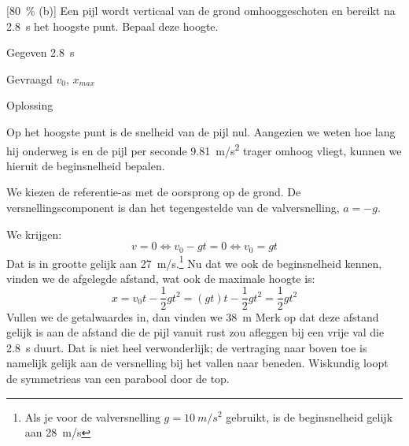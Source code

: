 
[\SI{80}{\percent} (b)] Een pijl wordt verticaal van de grond omhooggeschoten en bereikt na \SI{2,8}{s} het hoogste punt. Bepaal deze hoogte.
\begin{oplossing}
\item[Gegeven]\SI{2,8}{s}
\item[Gevraagd]$v_0$, $x_{max}$

\item[Oplossing]\begin{minipage}[t]{0.6\linewidth}
	Op het hoogste punt is de snelheid van de pijl nul. Aangezien we weten hoe lang hij onderweg is en de pijl per seconde \SI{9,81}{m/s^2} trager omhoog vliegt, kunnen we hieruit de beginsnelheid bepalen. 
	
	We kiezen de referentie-as met de oorsprong op de grond. De versnellingscomponent is dan het tegengestelde van de valversnelling, $a=-g$.
\end{minipage}%
\begin{minipage}[t]{0.37\linewidth}
	\raisebox{1ex-\height}{%
	\texttt{[image: 55p44]}%
	}
\end{minipage}

We krijgen:
\begin{equation*}
v=0\Leftrightarrow v_0-gt=0\Leftrightarrow v_0=gt
\end{equation*}
Dat is in grootte gelijk aan \SI{27}{m/s}.\footnote{Als je voor de valversnelling $g=\SI{10}{m/s^2}$ gebruikt, is de beginsnelheid gelijk aan \SI{28}{m/s}} Nu dat we ook de beginsnelheid kennen, vinden we de afgelegde afstand, wat ook de maximale hoogte is:
\begin{equation*}
x=v_0t-\frac{1}{2}gt^2=(gt)t-\frac{1}{2}gt^2=\frac{1}{2}gt^2
\end{equation*}
Vullen we de getalwaardes in, dan vinden we \SI{38}{m}
\newline
\newline
Merk op dat deze afstand gelijk is aan de afstand die de pijl vanuit rust zou afleggen bij een vrije val die \SI{2,8}{s} duurt. Dat is niet heel verwonderlijk; de vertraging naar boven toe is namelijk gelijk aan de versnelling bij het vallen naar beneden. Wiskundig loopt de symmetrieas van een parabool door de top. 

\end{oplossing}